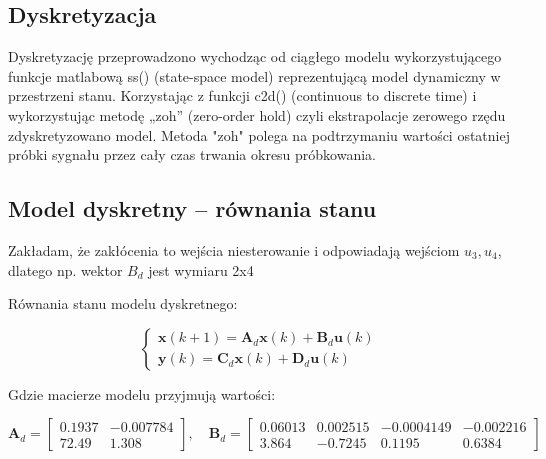 \documentclass[a4paper,12pt]{article}
\begin{document}

\subsection{Dyskretyzacja}

Dyskretyzację przeprowadzono wychodząc od ciągłego modelu wykorzystującego funkcje matlabową ss() (state-space model) reprezentującą model dynamiczny w przestrzeni stanu. Korzystając z funkcji c2d() (continuous to discrete time) i wykorzystując metodę „zoh” (zero-order hold) czyli ekstrapolacje zerowego rzędu zdyskretyzowano model. Metoda "zoh" polega na podtrzymaniu wartości ostatniej próbki sygnału przez cały czas trwania okresu próbkowania.

\subsection{Model dyskretny – równania stanu}

Zakładam, że zakłócenia to wejścia niesterowanie i odpowiadają wejściom $u_3, u_4$, dlatego np. wektor $B_d$ jest wymiaru 2x4

Równania stanu modelu dyskretnego:

\begin{equation}
\begin{cases}
    \mathbf{x}(k+1) = \mathbf{A}_d \mathbf{x}(k) + \mathbf{B}_d \mathbf{u}(k) \\
    \mathbf{y}(k) = \mathbf{C}_d \mathbf{x}(k) + \mathbf{D}_d \mathbf{u}(k)
\end{cases}
\end{equation}

Gdzie macierze modelu przyjmują wartości:

\begin{equation}
\mathbf{A}_d = \begin{bmatrix} 
0.1937 & -0.007784 \\ 
72.49 & 1.308 
\end{bmatrix}, \quad 
\mathbf{B}_d = \begin{bmatrix} 
0.06013 & 0.002515 & -0.0004149 & -0.002216 \\ 
3.864 & -0.7245 & 0.1195 & 0.6384 
\end{bmatrix}
\end{equation}
\end{document}
